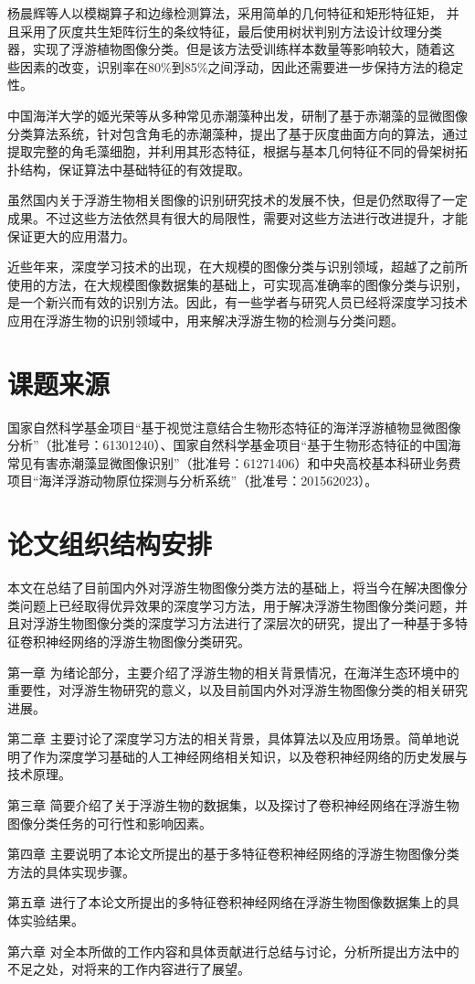 杨晨辉等人\cite{chencheng2009}以模糊算子和边缘检测算法，采用简单的几何特征和矩形特征矩， 并且采用了灰度共生矩阵衍生的条纹特征，最后使用树状判别方法设计纹理分类 器，实现了浮游植物图像分类。但是该方法受训练样本数量等影响较大，随着这 些因素的改变，识别率在80\%到85\%之间浮动，因此还需要进一步保持方法的稳定性。

中国海洋大学的姬光荣等\cite{qiaoxiaoyan2010}从多种常见赤潮藻种出发，研制了基于赤潮藻的显微图像分类算法系统，针对包含角毛的赤潮藻种，提出了基于灰度曲面方向的算法，通过提取完整的角毛藻细胞，并利用其形态特征，根据与基本几何特征不同的骨架树拓扑结构，保证算法中基础特征的有效提取。

虽然国内关于浮游生物相关图像的识别研究技术的发展不快，但是仍然取得了一定成果。不过这些方法依然具有很大的局限性，需要对这些方法进行改进提升，才能保证更大的应用潜力。

近些年来，深度学习技术的出现，在大规模的图像分类与识别领域，超越了之前所使用的方法，在大规模图像数据集的基础上，可实现高准确率的图像分类与识别，是一个新兴而有效的识别方法。因此，有一些学者与研究人员已经将深度学习技术应用在浮游生物的识别领域中，用来解决浮游生物的检测与分类问题。

\section{课题来源}

国家自然科学基金项目“基于视觉注意结合生物形态特征的海洋浮游植物显微图像分析”（批准号：61301240）、国家自然科学基金项目“基于生物形态特征的中国海常见有害赤潮藻显微图像识别”（批准号：61271406）和中央高校基本科研业务费项目“海洋浮游动物原位探测与分析系统”（批准号：201562023）。


\section{论文组织结构安排}

本文在总结了目前国内外对浮游生物图像分类方法的基础上，将当今在解决图像分类问题上已经取得优异效果的深度学习方法，用于解决浮游生物图像分类问题，并且对浮游生物图像分类的深度学习方法进行了深层次的研究，提出了一种基于多特征卷积神经网络的浮游生物图像分类研究。

第一章 为绪论部分，主要介绍了浮游生物的相关背景情况，在海洋生态环境中的重要性，对浮游生物研究的意义，以及目前国内外对浮游生物图像分类的相关研究进展。

第二章 主要讨论了深度学习方法的相关背景，具体算法以及应用场景。简单地说明了作为深度学习基础的人工神经网络相关知识，以及卷积神经网络的历史发展与技术原理。

第三章 简要介绍了关于浮游生物的数据集，以及探讨了卷积神经网络在浮游生物图像分类任务的可行性和影响因素。

第四章 主要说明了本论文所提出的基于多特征卷积神经网络的浮游生物图像分类方法的具体实现步骤。

第五章 进行了本论文所提出的多特征卷积神经网络在浮游生物图像数据集上的具体实验结果。

第六章 对全本所做的工作内容和具体贡献进行总结与讨论，分析所提出方法中的不足之处，对将来的工作内容进行了展望。
